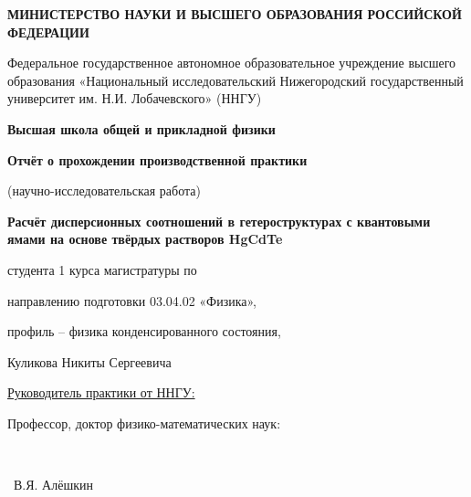 \documentclass[../main.tex]{subfiles}
\begin{document}
\begin{titlepage}
    \begin{center} 
      \small{\textbf{МИНИСТЕРСТВО НАУКИ И ВЫСШЕГО ОБРАЗОВАНИЯ РОССИЙСКОЙ ФЕДЕРАЦИИ}}
    \end{center}

    \begin{center}
    Федеральное государственное автономное образовательное учреждение высшего образования «Национальный исследовательский Нижегородский государственный университет им. Н.И. Лобачевского» (ННГУ)
    
    \vspace{0.0cm}
    \textbf{Высшая школа общей и прикладной физики}
    
    \end{center}
    
    \begin{center}
    {\bf{Отчёт о прохождении производственной практики}}

    {
      \small{(научно-исследовательская работа)}
    }

    \vspace{0.1cm}

    \bf{Расчёт дисперсионных соотношений в гетероструктурах с квантовыми ямами на основе
    твёрдых растворов HgCdTe}
    \end{center}
    
    \begin{flushright}
    студента 1 курса магистратуры по
    
    направлению подготовки 03.04.02 «Физика»,
    
    профиль – физика конденсированного состояния,
    
    Куликова Никиты Сергеевича

    \vspace{0.3 cm}
    \underline{Руководитель практики от ННГУ:}
    
    Профессор, доктор физико-математических наук:
    
    \begin{minipage}[t][0.1 cm][t]{2in}
      \underline{\hspace{2in}}\\ %
      \centering
    \end{minipage}~В.Я. Алёшкин
    

\end{flushright}
\end{titlepage}
\end{document}
